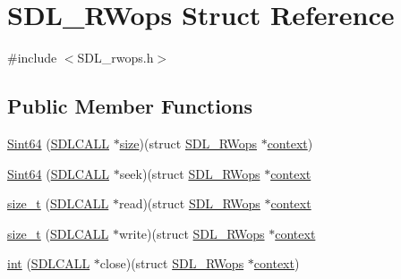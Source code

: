 \hypertarget{struct_s_d_l___r_wops}{}\section{S\+D\+L\+\_\+\+R\+Wops Struct Reference}
\label{struct_s_d_l___r_wops}


{\ttfamily \#include $<$S\+D\+L\+\_\+rwops.\+h$>$}

\subsection*{Public Member Functions}
\begin{DoxyCompactItemize}
\item 
\mbox{\hyperlink{struct_s_d_l___r_wops_a45f66dbb683a88281d96f83ca18c525f}{Sint64}} (\mbox{\hyperlink{begin__code_8h_a81faf4ba0455dc75f2e0507eddb79401}{S\+D\+L\+C\+A\+LL}} $\ast$\mbox{\hyperlink{_s_d_l__opengl__glext_8h_a3d1e3edfcf61ca2d831883e1afbad89e}{size}})(struct \mbox{\hyperlink{struct_s_d_l___r_wops}{S\+D\+L\+\_\+\+R\+Wops}} $\ast$\mbox{\hyperlink{pycapsule_8h_ae376f130b17d169ee51be68077a89ed0}{context}})
\item 
\mbox{\hyperlink{struct_s_d_l___r_wops_a767114391a3d1b4a7c214da3e164acf5}{Sint64}} (\mbox{\hyperlink{begin__code_8h_a81faf4ba0455dc75f2e0507eddb79401}{S\+D\+L\+C\+A\+LL}} $\ast$seek)(struct \mbox{\hyperlink{struct_s_d_l___r_wops}{S\+D\+L\+\_\+\+R\+Wops}} $\ast$\mbox{\hyperlink{pycapsule_8h_ae376f130b17d169ee51be68077a89ed0}{context}}
\item 
\mbox{\hyperlink{struct_s_d_l___r_wops_acd9a3c6e840d285c1e30cadaf99097b2}{size\+\_\+t}} (\mbox{\hyperlink{begin__code_8h_a81faf4ba0455dc75f2e0507eddb79401}{S\+D\+L\+C\+A\+LL}} $\ast$read)(struct \mbox{\hyperlink{struct_s_d_l___r_wops}{S\+D\+L\+\_\+\+R\+Wops}} $\ast$\mbox{\hyperlink{pycapsule_8h_ae376f130b17d169ee51be68077a89ed0}{context}}
\item 
\mbox{\hyperlink{struct_s_d_l___r_wops_a5f12fd517afffba5bfaff4643d6792b1}{size\+\_\+t}} (\mbox{\hyperlink{begin__code_8h_a81faf4ba0455dc75f2e0507eddb79401}{S\+D\+L\+C\+A\+LL}} $\ast$write)(struct \mbox{\hyperlink{struct_s_d_l___r_wops}{S\+D\+L\+\_\+\+R\+Wops}} $\ast$\mbox{\hyperlink{pycapsule_8h_ae376f130b17d169ee51be68077a89ed0}{context}}
\item 
\mbox{\hyperlink{struct_s_d_l___r_wops_ab303bcbb0f6742a141ba8b2998923f47}{int}} (\mbox{\hyperlink{begin__code_8h_a81faf4ba0455dc75f2e0507eddb79401}{S\+D\+L\+C\+A\+LL}} $\ast$close)(struct \mbox{\hyperlink{struct_s_d_l___r_wops}{S\+D\+L\+\_\+\+R\+Wops}} $\ast$\mbox{\hyperlink{pycapsule_8h_ae376f130b17d169ee51be68077a89ed0}{context}})
\end{DoxyCompactItemize}
